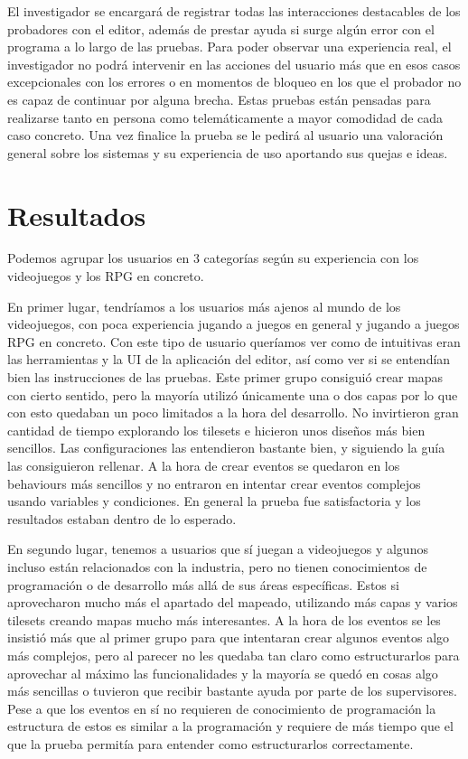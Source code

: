 \medskip

El investigador se encargará de registrar todas las interacciones destacables de los probadores con el editor, además de prestar ayuda si surge algún error con el programa a lo largo de las pruebas. Para poder observar una experiencia real, el investigador no podrá intervenir en las acciones del usuario más que en esos casos excepcionales con los errores o en momentos de bloqueo en los que el probador no es capaz de continuar por alguna brecha. Estas pruebas están pensadas para realizarse tanto en persona como telemáticamente a mayor comodidad de cada caso concreto. Una vez finalice la prueba se le pedirá al usuario una valoración general sobre los sistemas y su experiencia de uso aportando sus quejas e ideas.

\section{Resultados}

Podemos agrupar los usuarios en 3 categorías según su experiencia con los videojuegos y los RPG en concreto.

\smallskip 

En primer lugar, tendríamos a los usuarios más ajenos al mundo de los videojuegos, con poca experiencia jugando a juegos en general y jugando a juegos RPG en concreto. Con este tipo de usuario queríamos ver como de intuitivas eran las herramientas y la UI de la aplicación del editor, así como ver si se entendían bien las instrucciones de las pruebas. Este primer grupo consiguió crear mapas con cierto sentido, pero la mayoría utilizó únicamente una o dos capas por lo que con esto quedaban un poco limitados a la hora del desarrollo. No invirtieron gran cantidad de tiempo explorando los tilesets e hicieron unos diseños más bien sencillos. Las configuraciones las entendieron bastante bien, y siguiendo la guía las consiguieron rellenar. A la hora de crear eventos se quedaron en los behaviours más sencillos y no entraron en intentar crear eventos complejos usando variables y condiciones. En general la prueba fue satisfactoria y los resultados estaban dentro de lo esperado. 

\medskip

En segundo lugar, tenemos a usuarios que sí juegan a videojuegos y algunos incluso están relacionados con la industria, pero no tienen conocimientos de programación o de desarrollo más allá de sus áreas específicas. Estos si aprovecharon mucho más el apartado del mapeado, utilizando más capas y varios tilesets creando mapas mucho más interesantes. A la hora de los eventos se les insistió más que al primer grupo para que intentaran crear algunos eventos algo más complejos, pero al parecer no les quedaba tan claro como estructurarlos para aprovechar al máximo las funcionalidades y la mayoría se quedó en cosas algo más sencillas o tuvieron que recibir bastante ayuda por parte de los supervisores. Pese a que los eventos en sí no requieren de conocimiento de programación la estructura de estos es similar a la programación y requiere de más tiempo que el que la prueba permitía para entender como estructurarlos correctamente. 

